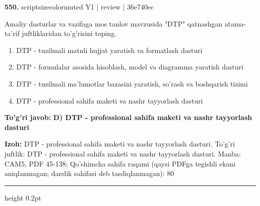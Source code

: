 \documentclass[10pt,a4paper]{article}
\begin{document}
{\bfseries\sffamily\color{ink} 550.} {scriptsizecolor{muted} Y1 | review | 36e740ec}
\par
Amaliy dasturlar va vazifaga mos tanlov mavzusida "DTP" qatnashgan atama-ta'rif juftliklaridan to'g'risini toping.
\begin{enumerate}[label=\Alph*),leftmargin=9mm]
\item DTP - tuzilmali matnli hujjat yaratish va formatlash dasturi
\item DTP - formulalar asosida hisoblash, model va diagramma yaratish dasturi
\item DTP - tuzilmali ma'lumotlar bazasini yaratish, so'rash va boshqarish tizimi
\item DTP - professional sahifa maketi va nashr tayyorlash dasturi
\end{enumerate}
\begin{tcolorbox}[enhanced,breakable,colback=teal!4,colframe=teal!60!black,boxrule=0.45pt,arc=1.2mm,left=2.7mm,right=2.7mm,top=1.8mm,bottom=1.8mm,before skip=2mm,after skip=2mm]
{\bfseries\sffamily\color{teal}To'g'ri javob:} \textbf{D) DTP - professional sahifa maketi va nashr tayyorlash dasturi}
\par\smallskip
{\bfseries Izoh:} DTP - professional sahifa maketi va nashr tayyorlash dasturi. To'g'ri juftlik: DTP - professional sahifa maketi va nashr tayyorlash dasturi. Manba: CAM5, PDF 45-138; Qo'shimcha sahifa raqami (qaysi PDFga tegishli ekani aniqlanmagan; darslik sahifasi deb tasdiqlanmagan): 80
\end{tcolorbox}
\vspace{2mm}\hrule height 0.2pt\vspace{3mm}
\end{document}
